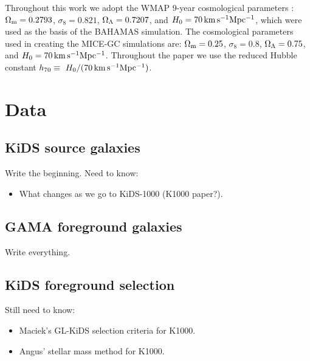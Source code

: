 \documentclass[fleqn,usenatbib]{mnras}
\begin{document}
Throughout this work we adopt the WMAP 9-year \cite[]{hinshaw2013} cosmological parameters : $\Omega_{\rm m}=0.2793$, $\sigma_8=0.821$, $\Omega_{\rm \Lambda}=0.7207$, and $H_0 = 70 \, {\rm km \, s^{-1} Mpc^{-1}}$, which were used as the basis of the BAHAMAS simulation.
The cosmological parameters used in creating the MICE-GC simulations are: $\Omega_{\rm m}=0.25$, $\sigma_8=0.8$, $\Omega_{\rm \Lambda}=0.75$, and $H_0 = 70 \, {\rm km \, s^{-1} Mpc^{-1}}$.
Throughout the paper we use the reduced Hubble constant $h_{70} \equiv \ H_0 / (70 \, {\rm km \, s^{-1} Mpc^{-1}})$.

\section{Data}
\label{sec:data}

\subsection{KiDS source galaxies}
\label{sec:kids}
Write the beginning.
Need to know:
\begin{itemize}
	\item What changes as we go to KiDS-1000 (K1000 paper?).
\end{itemize}

\subsection{GAMA foreground galaxies}
\label{sec:gama}
Write everything.

\subsection{KiDS foreground selection}
\label{sec:gamalike_kids}
Still need to know:
\begin{itemize}
	\item Maciek's GL-KiDS selection criteria for K1000.
	\item Angus' stellar mass method for K1000.
\end{itemize}
\end{document}
